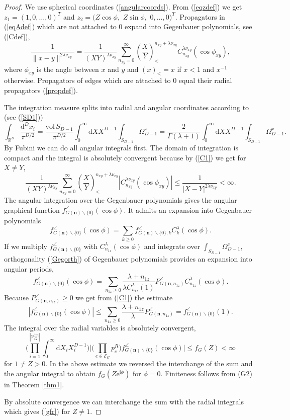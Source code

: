 \documentclass[oneside]{amsart}
\newcommand{\RR}{{\mathbb R}}
\newcommand{\ee}{\mathrm{e}}
\newcommand{\ii}{\mathrm{i}}
\newcommand{\dd}{\mathrm{d}}
\newcommand{\sE}{\mathcal{E}}
\newcommand{\sV}{\mathcal{V}}
\newcommand{\sVGint}{{\sV_G^\mathrm{int}}}
\newcommand{\VGint}{{|\sVGint|}}
\theoremstyle{plain}
\begin{document}
\begin{proof}
We use spherical coordinates (\ref{angularcoords}). From (\ref{eqzdef}) we get $z_1=(1,0,\ldots,0)^T$ and $z_2=(Z\cos\phi,$ $Z\sin\phi,$ $0,\ldots,0)^T$.
Propagators in (\ref{eqAdef}) which are not attached to 0 expand into Gegenbauer polynomials, see (\ref{Cdef}),
\begin{equation}\label{propagator}
\frac{1}{\|x-y\|^{2\lambda\nu_{xy}}}=\frac{1}{(XY)^{\lambda\nu_{xy}}}\sum_{n_{xy}=0}^\infty\left(\frac{X}{Y}\right)_<^{n_{xy}+\lambda\nu_{xy}}C^{\lambda\nu_{xy}}_{n_{xy}}(\cos\phi_{xy}),
\end{equation}
where $\phi_{xy}$ is the angle between $x$ and $y$ and $(x)_<=x$ if $x<1$ and $x^{-1}$ otherwise. Propagators of edges which are attached to 0 equal their radial propagators (\ref{propdef}).

The integration measure splits into radial and angular coordinates according to (see (\ref{SD1}))
$$
\int_{\RR^D}\frac{\dd^Dx_i}{\pi^{D/2}}=\frac{\text{vol}\,S_{D-1}}{\pi^{D/2}}\int_0^\infty\dd X X^{D-1}\int_{S_{D-1}}\Omega^x_{D-1}
 =\frac{2}{\Gamma(\lambda+1)}\int_0^\infty\dd X X^{D-1}\int_{S_{D-1}}\Omega^x_{D-1}.
$$
By Fubini we can do all angular integrals first. The domain of integration is compact and the integral is absolutely convergent because by (\ref{C1}) we get for $X\neq Y$,
$$
\frac{1}{(XY)^{\lambda\nu_{xy}}}\sum_{n_{xy}=0}^\infty\left(\frac{X}{Y}\right)_<^{n_{xy}+\lambda\nu_{xy}}|C^{\lambda\nu_{xy}}_{n_{xy}}(\cos\phi_{xy})|
\leq\frac{1}{|X-Y|^{2\lambda\nu_{xy}}}<\infty.
$$
The angular integration over the Gegenbauer polynomials gives the angular graphical function $f_{G(\mathbf n)\backslash\{0\}}^\angle(\cos\phi)$.
It admits an expansion into Gegenbauer polynomials
\begin{equation}\label{eqpfpf4}
f_{G(\mathbf n)\backslash\{0\}}^\angle(\cos\phi)=\sum_{k\geq0}f_{G(\mathbf n)\backslash\{0\},k}^\angle C^\lambda_k(\cos\phi).
\end{equation}
If we multiply $f_{G(\mathbf n)\backslash\{0\}}^\angle$ with $C^\lambda_{n_{1z}}(\cos\phi)$ and integrate over $\int_{S_{D-1}}\Omega^z_{D-1}$, orthogonality
(\ref{Gegorth}) of Gegenbauer polynomials provides an expansion into angular periods,
$$
f_{G(\mathbf n)\backslash\{0\}}^\angle(\cos\phi)=\sum_{n_{1z}\geq0}\frac{\lambda+n_{1z}}{\lambda C^\lambda_{n_{1z}}(1)}P_{G(\mathbf n,n_{1z})}^\angle C^\lambda_{n_{1z}}(\cos\phi).
$$
Because $P_{G(\mathbf n,n_{1z})}^\angle\geq0$ we get from (\ref{C1}) the estimate
$$
|f_{G(\mathbf n)\backslash\{0\}}^\angle(\cos\phi)|\leq\sum_{n_{1z}\geq0}\frac{\lambda+n_{1z}}{\lambda}P_{G(\mathbf n,n_{1z})}^\angle=f_{G(\mathbf n)\backslash\{0\}}^\angle(1).
$$
The integral over the radial variables is absolutely convergent,
$$
\Big(\prod_{i=1}^\VGint\int_0^\infty\dd X_i X_i^{D-1}\Big)\Big|\Big(\prod_{e\in\sE_G}p^R_e\Big)f_{G(\mathbf n)\backslash\{0\}}^\angle(\cos\phi)\Big|\leq f_G(Z)<\infty
$$
for $1\neq Z>0$. In the above estimate we reversed the interchange of the sum and the angular integral to obtain $f_G(Z\ee^{\ii\phi})$ for $\phi=0$. Finiteness follows from
(G2) in Theorem \ref{thm1}.

By absolute convergence we can interchange the sum with the radial integrals which gives (\ref{gfr}) for $Z\neq1$.
\end{proof}
\end{document}
